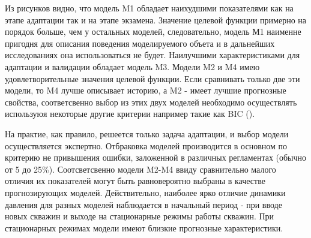 \documentclass{article}
\begin{document}
Из рисунков видно, что модель M1 обладает наихудшими показателями как на этапе адаптации так и на этапе экзамена. Значение целевой функции примерно на порядок больше, чем у остальных моделей, следовательно, модель М1 наименне пригодня для описания поведения моделируемого объета и в дальнейших исследованиях она использоваться не будет. Наилучшими характеристиками для адаптации и валидации обладает модель M3. Модели M2 и M4 имею удовлетворительные значения целевой функции. Если сравнивать только две эти модели, то M4 лучше описывает историю, а M2 - имеет лучшие прогнозные свойства, соответсвенно выбор из этих двух моделей необходимо осуществлять используюя некоторые другие критерии например такие как BIC (\cite{mus}).

На практие, как правило, решеется только задача адаптации, и выбор модели осуществляется экспертно. Отбраковка моделей производится в основном по критерию не привышения ошибки, заложенной в различных регламентах (обычно от 5 до 25\%). Соотсветсвенно модели M2-M4 ввиду сравнительно малого отличия их показателей могут быть равновероятно выбраны в качестве прогнозирующих моделей. Действительно, наиболее ярко отличие динамики давления для разных моделей наблюдается в начальный период - при вводе новых скважин и выходе на стационарные режимы работы скважин. При стационарных режимах модели имеют близкие прогнозные характеристики. 
\end{document}
